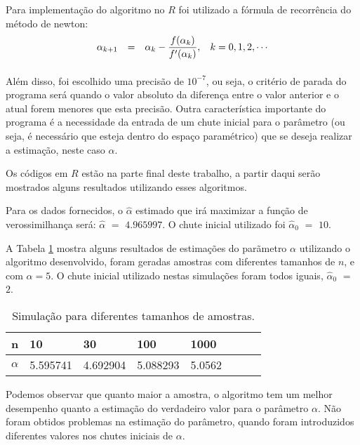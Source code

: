 \documentclass[a4paper, 11pt]{article}
\begin{document}
Para implementação do algoritmo no $R$ foi utilizado a fórmula de recorrência do método de newton:
\begin{equation*}
\begin{array}{lclll}
\alpha_{k+1} & = & \alpha_{k} - \dfrac{f(\alpha_{k})}{f'(\alpha_{k})}, \hspace{2ex} k=0,1,2,\cdots \\[10pt] 
\end{array}
\end{equation*}

Além disso, foi escolhido uma precisão de $10^{-7}$, ou seja, o critério de parada do programa será quando o valor absoluto da diferença entre o valor anterior e o atual forem menores que esta precisão. Outra característica importante do programa é a necessidade da entrada de um chute inicial para o parâmetro (ou seja, é necessário que esteja dentro do espaço paramétrico) que se deseja realizar a estimação, neste caso $\alpha$. 

Os códigos em $R$ estão na parte final deste trabalho, a partir daqui serão mostrados alguns resultados utilizando esses algoritmos. 

Para os dados fornecidos, o $\hat{\alpha}$ estimado que irá maximizar a função de verossimilhança será: $\hat{\alpha}$ $=$ $4.965997$. O chute inicial utilizado foi $\hat{\alpha}_{0}$ $=$ $10$.

A Tabela \ref{tab1} mostra alguns resultados de estimações do parãmetro $\alpha$  utilizando o algoritmo desenvolvido, foram geradas amostras com diferentes tamanhos de $n$, e com $\alpha = 5$. O chute inicial utilizado nestas simulações foram todos iguais, $\hat{\alpha}_{0}$ $=$ $2$.

\begin{table}[H]
\caption{Simulação para diferentes tamanhos de amostras.}\label{tab1}
\centering
\begin{tabular}{llllllcc}
\hline
n & 10 & 30 & 100 & 1000  \\
\hline
$\alpha$ & 5.595741 & 4.692904 & 5.088293 & 5.0562 \\
\hline
\end{tabular}
\end{table}

Podemos observar que quanto maior a amostra, o algoritmo tem um melhor desempenho quanto a estimação do verdadeiro valor para o parâmetro $\alpha$. Não foram obtidos problemas na estimação do parâmetro, quando foram introduzidos diferentes valores nos chutes iniciais de $\alpha$.
\end{document}
